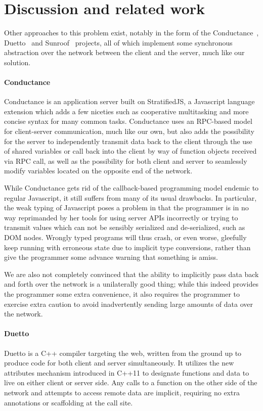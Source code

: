 \documentclass[preprint]{sigplanconf}
\begin{document}
\section{Discussion and related work}

Other approaches to this problem exist, notably in the form of the
Conductance\ \cite{conductance}, Duetto\ \cite{duetto} and
Sunroof\ \cite{sunroof} projects, all of which implement some synchronous
abstraction over the network between the client and the server, much like our
solution.

\paragraph{Conductance} Conductance is an application server built on
StratifiedJS, a Javascript language extension which adds a few niceties such as
cooperative multitasking and more concise syntax for many common tasks.
Conductance uses an RPC-based model for client-server communication, much like
our own, but also adds the possibility for the server to independently transmit
data back to the client through the use of shared variables or call back into
the client by way of function objects received via RPC call, as well as the
possibility for both client and server to seamlessly modify variables located
on the opposite end of the network.

While Conductance gets rid of the callback-based programming model endemic to
regular Javascript, it still suffers from many of its usual drawbacks. In
particular, the weak typing of Javascript poses a problem in that the
programmer is in no way reprimanded by her tools for using server APIs
incorrectly or trying to transmit values which can not be sensibly serialized
and de-serialized, such as DOM nodes. Wrongly typed programs will thus crash, or
even worse, gleefully keep running with erroneous state due to implicit type
conversions, rather than give the programmer some advance warning that something
is amiss.

We are also not completely convinced that the ability to implicitly pass data
back and forth over the network is a unilaterally good thing; while this indeed
provides the programmer some extra convenience, it also requires the programmer
to exercise extra caution to avoid inadvertently sending large amounts of data
over the network.

\paragraph{Duetto} Duetto is a C++ compiler targeting the web, written from
the ground up to produce code for both client and server simultaneously. It
utilizes the new attributes mechanism introduced in C++11 to designate
functions and data to live on either client or server side. Any calls to a
function on the other side of the network and attempts to access remote data
are implicit, requiring no extra annotations or scaffolding at the call site.
\end{document}
